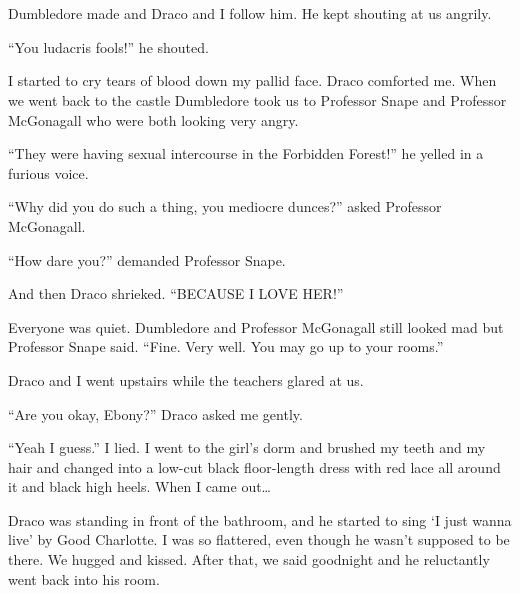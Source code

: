 \section{}



Dumbledore made and Draco and I follow him. He kept shouting at us angrily.

\enquote{You ludacris fools!} he shouted.

I started to cry tears of blood down my pallid face. Draco comforted me. When we went back to the castle Dumbledore took us to Professor Snape and Professor McGonagall who were both looking very angry.

\enquote{They were having sexual intercourse in the Forbidden Forest!} he yelled in a furious voice.

\enquote{Why did you do such a thing, you mediocre dunces?} asked Professor McGonagall.

\enquote{How dare you?} demanded Professor Snape.

And then Draco shrieked. \enquote{BECAUSE I LOVE HER!}

Everyone was quiet. Dumbledore and Professor McGonagall still looked mad but Professor Snape said. \enquote{Fine. Very well. You may go up to your rooms.}

Draco and I went upstairs while the teachers glared at us.

\enquote{Are you okay, Ebony?} Draco asked me gently.

\enquote{Yeah I guess.} I lied. I went to the girl's dorm and brushed my teeth and my hair and changed into a low-cut black floor-length dress with red lace all around it and black high heels. When I came out\ldots

Draco was standing in front of the bathroom, and he started to sing \enquote*{I just wanna live} by Good Charlotte. I was so flattered, even though he wasn't supposed to be there. We hugged and kissed. After that, we said goodnight and he reluctantly went back into his room.
